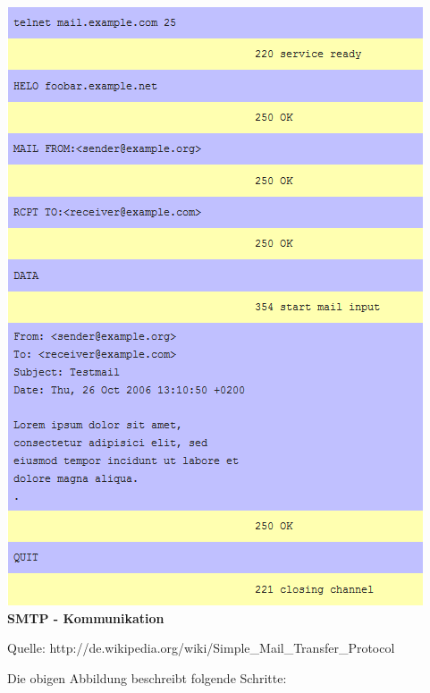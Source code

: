 \documentclass[12pt,a4paper]{report}
\begin{document}
\begin{onehalfspace}
\begin{center}
\includegraphics[scale=0.9]{../docs/lyaton/graphics/SMTP-Kommunikation.png}\\
\textbf{SMTP - Kommunikation}\\
\begin{scriptsize}
Quelle: http://de.wikipedia.org/wiki/Simple\_Mail\_Transfer\_Protocol
\end{scriptsize}
\end{center}
Die obigen Abbildung beschreibt folgende Schritte:


\end{onehalfspace}
\end{document}

